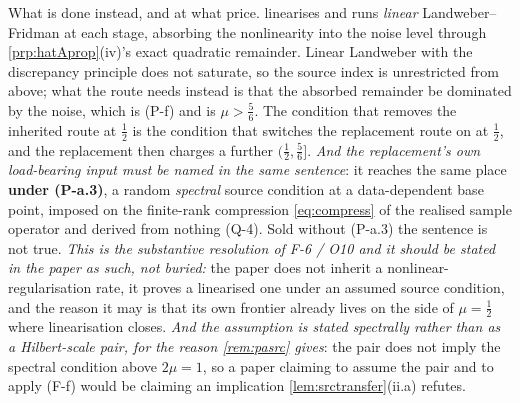 \begin{remark}
What is done instead, and at what price.  linearises and
runs \emph{linear} Landweber--Fridman at each stage, absorbing the nonlinearity into the noise level
through \cref{prp:hatAprop}(iv)'s exact quadratic remainder. Linear Landweber with the discrepancy
principle does not saturate, so the source index is unrestricted from above; what the route needs
instead is that the absorbed remainder be dominated by the noise, which is (P-f) and is
$\mu>\tfrac56$. The condition that removes the inherited route at $\tfrac12$ is the condition
that switches the replacement route on at $\tfrac12$, and the replacement then charges a further
$(\tfrac12,\tfrac56]$. \emph{And the replacement's own load-bearing input must be named in the same
sentence}: it reaches the same place \textbf{under (P-a.3)}, a random \emph{spectral} source condition at
a data-dependent base point, imposed on the finite-rank compression \eqref{eq:compress} of the realised
sample operator and derived from nothing (Q-4). Sold without (P-a.3) the sentence is not true.
\emph{This is the substantive resolution of F-6 / O10 and it should be stated in the paper as such, not
buried:} the paper does not inherit a nonlinear-regularisation rate, it proves a linearised one under an
assumed source condition, and the reason it may is that its own frontier already lives on the side of
$\mu=\tfrac12$ where linearisation closes. \emph{And the assumption is stated spectrally rather than as a
Hilbert-scale pair, for the reason \cref{rem:pasrc} gives}: the pair does not imply the spectral condition
above $2\mu=1$, so a paper claiming to assume the pair and to apply (F-f) would be claiming an implication
\cref{lem:srctransfer}(ii.a) refutes.


\end{remark}
